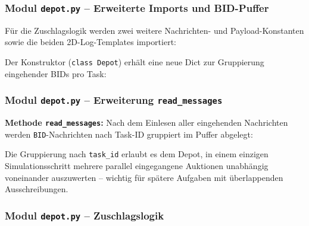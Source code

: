 
\subsubsection{Modul \texttt{depot.py} – Erweiterte Imports und BID-Puffer}

Für die Zuschlagslogik werden zwei weitere Nachrichten- und Payload-Konstanten sowie die beiden 2D-Log-Templates importiert:



Der Konstruktor (\texttt{class Depot}) erhält eine neue Dict zur Gruppierung eingehender BIDs pro Task:




\subsubsection{Modul \texttt{depot.py} – Erweiterung \texttt{read\_messages}}

\textbf{Methode \texttt{read\_messages}:} Nach dem Einlesen aller eingehenden Nachrichten werden \texttt{BID}-Nachrichten nach Task-ID gruppiert im Puffer abgelegt:



Die Gruppierung nach \texttt{task\_id} erlaubt es dem Depot, in einem einzigen Simulationsschritt mehrere parallel eingegangene Auktionen unabhängig voneinander auszuwerten -- wichtig für spätere Aufgaben mit überlappenden Ausschreibungen.


\subsubsection{Modul \texttt{depot.py} – Zuschlagslogik}
\label{sssec:depot_award_2d}

